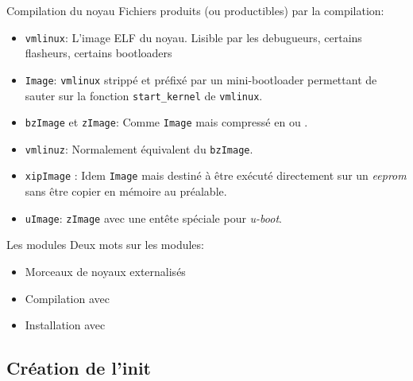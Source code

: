\begin{frame}[fragile=singleslide]{Compilation du noyau}
  Fichiers produits (ou productibles) par la compilation:
  \begin{itemize}
  \item  \verb+vmlinux+:  L'image  ELF  du  noyau.   Lisible  par  les
    debugueurs, certains flasheurs, certains bootloaders
  \item  \verb+Image+:  \verb+vmlinux+   strippé  et  préfixé  par  un
    mini-bootloader   permettant    de   sauter   sur    la   fonction
    \verb+start_kernel+ de \verb+vmlinux+.
  \item  \verb+bzImage+  et   \verb+zImage+: Comme \verb+Image+ mais compressé en  ou .
  \item  \verb+vmlinuz+: Normalement  équivalent  du \verb+bzImage+.
  \item  \verb+xipImage+  :  Idem  \verb+Image+ mais  destiné  à  être
    exécuté  directement  sur un  \emph{eeprom}  sans  être copier  en
    mémoire au préalable.
  \item  \verb+uImage+:  \verb+zImage+ avec  une  entête spéciale  pour
    \emph{u-boot}.
  \end{itemize}
\end{frame}

\begin{frame}[fragile=singleslide]{Les modules}
Deux mots sur les modules:
  \begin{itemize}
  \item Morceaux de noyaux externalisés
  \item Compilation avec 
  \item Installation avec 
  \end{itemize}
\end{frame}

\subsection{Création de l'init}

